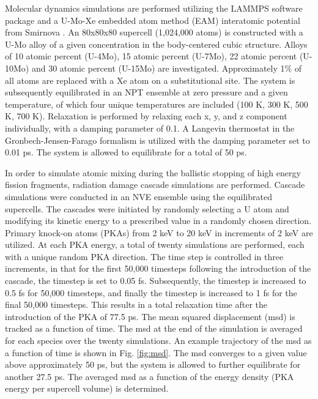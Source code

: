 \documentclass[review]{elsarticle}
\begin{document}
Molecular dynamics simulations are performed utilizing the LAMMPS \cite{plimpton1995} software package and a U-Mo-Xe embedded atom method (EAM) interatomic potential from Smirnova \cite{smirnovaUMo}. An 80x80x80 supercell (1,024,000 atoms) is constructed with a U-Mo alloy of a given concentration in the body-centered cubic structure. Alloys of 10 atomic percent (U-4Mo), 15 atomic percent (U-7Mo), 22 atomic percent (U-10Mo) and 30 atomic percent (U-15Mo) are investigated. Approximately 1\% of all atoms are replaced with a Xe atom on a substitutional site. The system is subsequently equilibrated in an NPT ensemble at zero pressure and a given temperature, of which four unique temperatures are included (100 K, 300 K, 500 K, 700 K). Relaxation is performed by relaxing each x, y, and z component individually, with a damping parameter of 0.1. A Langevin thermostat in the Gronbech-Jensen-Farago \cite{gjf2013, gjf2014} formalism is utilized with the damping parameter set to 0.01 ps. The system is allowed to equilibrate for a total of 50 ps.

In order to simulate atomic mixing during the ballistic stopping of high energy fission fragments, radiation damage cascade simulations are performed. Cascade simulations were conducted in an NVE ensemble using the equilibrated supercells. The cascades were initiated by randomly selecting a U atom and modifying its kinetic energy to a prescribed value in a randomly chosen direction. Primary knock-on atoms (PKAs) from 2 keV to 20 keV in increments of 2 keV are utilized. At each PKA energy, a total of twenty simulations are performed, each with a unique random PKA direction. The time step is controlled in three increments, in that for the first 50,000 timesteps following the introduction of the cascade, the timestep is set to 0.05 fs. Subsequently, the timestep is increased to 0.5 fs for 50,000 timesteps, and finally the timestep is increased to 1 fs for the final 50,000 timesteps. This results in a total relaxation time after the introduction of the PKA of 77.5 ps. The mean squared displacement (msd) is tracked as a function of time. The msd at the end of the simulation is averaged for each species over the twenty simulations. An example trajectory of the msd as a function of time is shown in Fig. \ref{fig:msd}. The msd converges to a given value above approximately 50 ps, but the system is allowed to further equilibrate for another 27.5 ps. The averaged msd as a function of the energy density (PKA energy per supercell volume) is determined. 
\end{document}
